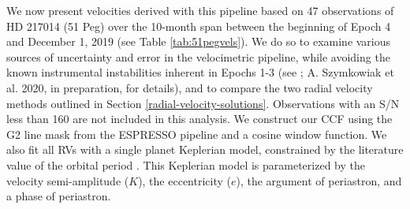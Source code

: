 We now present velocities derived with this pipeline based on 47 observations of HD 217014 (51 Peg) over the 10-month span between the beginning of Epoch 4 and December 1, 2019 (see Table \ref{tab:51pegvels}). We do so to examine various sources of uncertainty and error in the velocimetric pipeline, while avoiding the known instrumental instabilities inherent in Epochs 1-3 (see \citealt{blackman_performance_2020}; A. Szymkowiak et al. 2020, in preparation, for details), and to compare the two radial velocity methods outlined in Section \ref{radial-velocity-solutions}. Observations with an S/N less than 160 are not included in this analysis. We construct our CCF using the G2 line mask from the ESPRESSO pipeline \citep{freudling_automated_2013, modigliani_espresso_2019} and a cosine window function. We also fit all RVs with a single planet Keplerian model, constrained by the literature value of the orbital period \citep[4.2308 days,][]{wang_eccentricity_2011}. This Keplerian model is parameterized by the velocity semi-amplitude ($K$), the eccentricity ($e$), the argument of periastron, and a phase of periastron.

